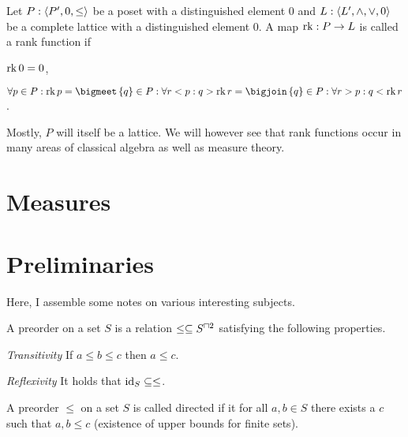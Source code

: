 \documentclass[8pt,a4paper]{article}
\begin{document}
\begin{definition}
    Let $P:\struct{P',0,\leq}$ be a poset with a distinguished element 0 and $L:\struct{L',\meet,\join,0}$ be a complete lattice with a distinguished element 0.
    A map $\mathop\mathrm{rk}:P\rightarrow L$ is called a rank function if
    \begin{properties}
            \item $\mathop\mathrm{rk}{0}=0$,
            \item $\forall p\in P: \rk{p}=\bigmeet\set{q\in P:\forall r<p: q>\rk{r}}=\bigjoin\set{q\in P:\forall r>p: q<\rk{r}}$.
    \end{properties}
\end{definition}

\begin{remark}
    Mostly, $P$ will itself be a lattice. We will however see that rank functions occur in many areas of classical algebra as well as measure theory.
\end{remark}



\section{Measures}



\section{Preliminaries}

Here, I assemble some notes on various interesting subjects.

\begin{definition}[preorder]
    A preorder on a set $S$ is a relation $\leq\setleq S^{\settimes2}$ satisfying the following properties.
    \begin{statements}
            \item \emph{Transitivity} If $a\leq b\leq c$ then $a\leq c$.
            \item \emph{Reflexivity} It holds that $\mathop\mathrm{id}\nolimits_S\subseteq \leq$. 
    \end{statements}
\end{definition}

\begin{definition}[Directedness]
    A preorder $\leq$ on a set $S$ is called directed if it for all $a,b\in S$ there exists a $c$ such that $a,b\leq c$ (existence of upper bounds for finite sets).
\end{definition}
\end{document}

